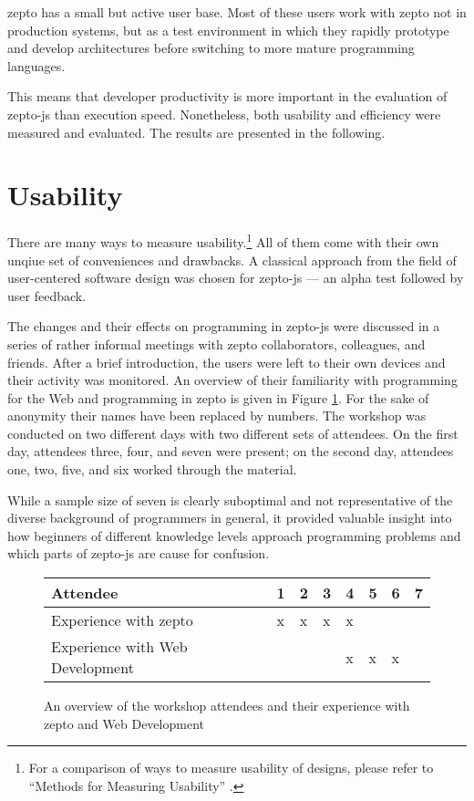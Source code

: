 \documentclass[oneside,11pt,xetex]{scrbook}
\begin{document}
zepto has a small but active user base. Most of these users work with zepto
not in production systems, but as a test environment in which they rapidly
prototype and develop architectures before switching to more mature programming
languages.

This means that developer productivity is more important in the evaluation of
zepto-js than execution speed. Nonetheless, both usability and efficiency
were measured and evaluated. The results are presented in the following.

\section{Usability}

There are many ways to measure usability.\footnote{For a comparison of ways
to measure usability of designs, please refer to ``Methods for Measuring
Usability'' \parencite{USBL}.} All of them come with their own unqiue set
of conveniences and drawbacks. A classical approach from the field of
user-centered software design was chosen for zepto-js --- an alpha test
followed by user feedback.

The changes and their effects on programming in zepto-js were discussed in
a series of rather informal meetings with zepto collaborators, colleagues,
and friends. After a brief introduction, the users were left to their own
devices and their activity was monitored. An overview of their familiarity
with programming for the Web and programming in zepto is given in Figure
\ref{fig:attendees}. For the sake of anonymity their names have been replaced
by numbers. The workshop was conducted on two different days with two different
sets of attendees. On the first day, attendees three, four, and seven were present;
on the second day, attendees one, two, five, and six worked through the material.

While a sample size of seven is clearly suboptimal and not representative
of the diverse background of programmers in general, it provided valuable
insight into how beginners of different knowledge levels approach
programming problems and which parts of zepto-js are cause for confusion.

\begin{figure}
\centering
  \begin{tabu}{| l | l | l | l | l | l | l | l |}
  \hline
  \rowfont{\footnotesize}
  Attendee                        & 1 & 2 & 3 & 4 & 5 & 6 & 7 \\ \hline
  \rowfont{\footnotesize}
  Experience with zepto           & x & x & x & x &   &   &   \\ \hline
  \rowfont{\footnotesize}
  Experience with Web Development &   &   &   & x & x & x &   \\ \hline
  \end{tabu}
  \caption{An overview of the workshop attendees and their experience with zepto and Web Development}
\label{fig:attendees}
\end{figure}
\end{document}
